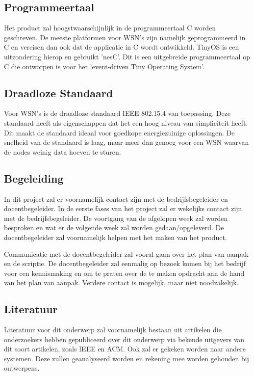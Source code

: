 \subsection{Programmeertaal}
Het product zal hoogstwaarschijnlijk in de programmeertaal C worden geschreven. De meeste platformen voor WSN's zijn namelijk geprogrammeerd in C en vereisen dan ook dat de applicatie in C wordt ontwikkeld. TinyOS is een uitzondering hierop en gebruikt 'nesC'. Dit is een uitgebreide programmeertaal op C die ontworpen is voor het 'event-driven Tiny Operating System'.\cite{nesC}

\subsection{Draadloze Standaard}
Voor WSN's is de draadloze standaard IEEE 802.15.4 van toepassing. Deze standaard heeft als eigenschappen dat het een hoog niveau van simpliciteit heeft. Dit maakt de standaard ideaal voor goedkope energiezuinige oplossingen. De snelheid van de standaard is laag, maar meer dan genoeg voor een WSN waarvan de nodes weinig data hoeven te sturen.

\subsection{Begeleiding}
In dit project zal er voornamelijk contact zijn met de bedrijfsbegeleider en docentbegeleider. In de eerste fases van het project zal er wekelijks contact zijn met de bedrijfsbegeleider. De voortgang van de afgelopen week zal worden besproken en wat er de volgende week zal worden gedaan/opgeleverd. De docentbegeleider zal voornamelijk helpen met het maken van het product.

Communicatie met de docentbegeleider zal vooral gaan over het plan van aanpak en de scriptie. De docentbegeleider zal eenmalig op bezoek komen bij het bedrijf voor een kennismaking en om te praten over de te maken opdracht aan de hand van het plan van aanpak. Verdere contact is mogelijk, maar niet noodzakelijk.

\subsection{Literatuur}
Literatuur voor dit onderwerp zal voornamelijk bestaan uit artikelen die onderzoekers hebben gepubliceerd over dit onderwerp via bekende uitgevers van dit soort artikelen, zoals IEEE en ACM. Ook zal er gekeken worden naar andere systemen. Deze zullen geanalyseerd worden en rekening mee worden gehouden bij ontwerpens.

